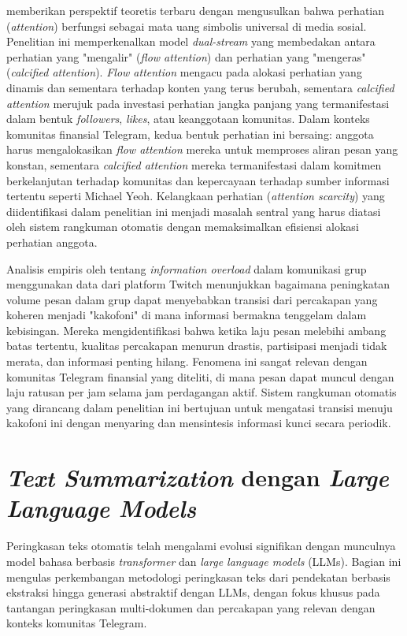 \textcite{heitmayer2025} memberikan perspektif teoretis terbaru dengan mengusulkan bahwa perhatian (\textit{attention}) berfungsi sebagai mata uang simbolis universal di media sosial. Penelitian ini memperkenalkan model \textit{dual-stream} yang membedakan antara perhatian yang "mengalir" (\textit{flow attention}) dan perhatian yang "mengeras" (\textit{calcified attention}). \textit{Flow attention} mengacu pada alokasi perhatian yang dinamis dan sementara terhadap konten yang terus berubah, sementara \textit{calcified attention} merujuk pada investasi perhatian jangka panjang yang termanifestasi dalam bentuk \textit{followers}, \textit{likes}, atau keanggotaan komunitas. Dalam konteks komunitas finansial Telegram, kedua bentuk perhatian ini bersaing: anggota harus mengalokasikan \textit{flow attention} mereka untuk memproses aliran pesan yang konstan, sementara \textit{calcified attention} mereka termanifestasi dalam komitmen berkelanjutan terhadap komunitas dan kepercayaan terhadap sumber informasi tertentu seperti Michael Yeoh. Kelangkaan perhatian (\textit{attention scarcity}) yang diidentifikasi dalam penelitian ini menjadi masalah sentral yang harus diatasi oleh sistem rangkuman otomatis dengan memaksimalkan efisiensi alokasi perhatian anggota.

Analisis empiris oleh \textcite{nematzadeh2019} tentang \textit{information overload} dalam komunikasi grup menggunakan data dari platform Twitch menunjukkan bagaimana peningkatan volume pesan dalam grup dapat menyebabkan transisi dari percakapan yang koheren menjadi "kakofoni" di mana informasi bermakna tenggelam dalam kebisingan. Mereka mengidentifikasi bahwa ketika laju pesan melebihi ambang batas tertentu, kualitas percakapan menurun drastis, partisipasi menjadi tidak merata, dan informasi penting hilang. Fenomena ini sangat relevan dengan komunitas Telegram finansial yang diteliti, di mana pesan dapat muncul dengan laju ratusan per jam selama jam perdagangan aktif. Sistem rangkuman otomatis yang dirancang dalam penelitian ini bertujuan untuk mengatasi transisi menuju kakofoni ini dengan menyaring dan mensintesis informasi kunci secara periodik.


\section{\textit{Text Summarization} dengan \textit{Large Language Models}}
\label{sec:text-summarization}

Peringkasan teks otomatis telah mengalami evolusi signifikan dengan munculnya model bahasa berbasis \textit{transformer} dan \textit{large language models} (LLMs). Bagian ini mengulas perkembangan metodologi peringkasan teks dari pendekatan berbasis ekstraksi hingga generasi abstraktif dengan LLMs, dengan fokus khusus pada tantangan peringkasan multi-dokumen dan percakapan yang relevan dengan konteks komunitas Telegram.

